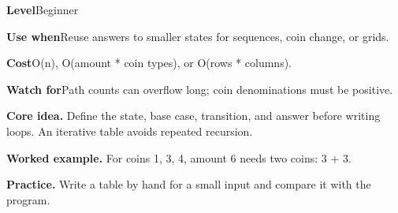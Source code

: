 \documentclass[10pt,letterpaper]{article}
\newcommand{\entrylabel}[1]{\textcolor{accent}{\bfseries #1}}
\begin{document}
\begin{guidebox}\small
\entrylabel{Level}\quad Beginner\par
\entrylabel{Use when}\quad Reuse answers to smaller states for sequences, coin change, or grids.\par
\entrylabel{Cost}\quad O(n), O(amount * coin types), or O(rows * columns).\par
\entrylabel{Watch for}\quad Path counts can overflow long; coin denominations must be positive.\par
\end{guidebox}
\noindent\textbf{Core idea.} Define the state, base case, transition, and answer before writing loops. An iterative table avoids repeated recursion.\par
\noindent\textbf{Worked example.} For coins 1, 3, 4, amount 6 needs two coins: 3 + 3.\par
\noindent\textbf{Practice.} Write a table by hand for a small input and compare it with the program.\par
\end{document}
